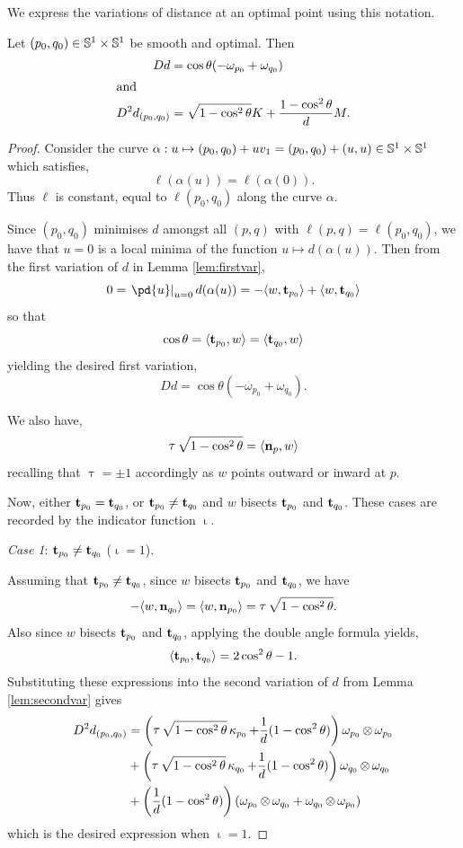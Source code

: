 \documentclass[11pt]{amsart}
\DeclareMathOperator{\tangindicator}{\iota}
\DeclareMathOperator{\norindicator}{\tau}
\begin{document}
We express the variations of distance at an optimal point using this notation.

\begin{prop}
\label{prop:spatial_var}
Let $(p_0, q_0) \in \mathbb{S}^1 \times \mathbb{S}^1$ be smooth and optimal. Then
\[
\begin{split}
D d &= \cos\theta(-\omega_{p_0} + \omega_{q_0}) \\
\intertext{and}
D^2d_{(p_0,q_0)} &= \sqrt{1-\cos^2\theta}K + \frac{1-\cos^2 \theta}{d} M.
\end{split}
\]
\end{prop}

\begin{proof}
Consider the curve $\alpha: u \mapsto (p_0,q_0) + uv_1 = (p_0,q_0) + (u, u) \in \mathbb{S}^1\times \mathbb{S}^1$ which satisfies,
\[
\ell(\alpha(u)) = \ell(\alpha(0)).
\]
Thus $\ell$ is constant, equal to $\ell(p_0, q_0)$ along the curve $\alpha$.

Since $(p_0, q_0)$ minimises $d$ amongst all $(p,q)$ with $\ell(p, q) = \ell(p_0, q_0)$, we have that $u=0$ is a local minima of the function $u\mapsto d(\alpha(u))$. Then from the first variation of $d$ in Lemma \ref{lem:firstvar},
\[
0 = \left.\pd{u}\right|_{u=0} d(\alpha(u)) = -\ip{w}{\tang_{p_0}} + \ip{w}{\tang_{q_0}}
\]
so that
\[
\cos\theta = \langle{\operatorname{\mathbf{t}}_{p_0}},{w}\rangle = \langle{\operatorname{\mathbf{t}}_{q_0}},{w}\rangle
\]
yielding the desired first variation,
\[
Dd = \cos\theta(-\omega_{p_0} + \omega_{q_0}).
\]

We also have,
\[
\norindicator \sqrt{1 - \cos^2 \theta} = \ip{\nor_p}{w}
\]
recalling that \(\norindicator = \pm 1\) accordingly as \(w\) points outward or inward at \(p\).

Now, either $\operatorname{\mathbf{t}}_{p_0} = \operatorname{\mathbf{t}}_{q_0}$, or $\operatorname{\mathbf{t}}_{p_0} \ne \operatorname{\mathbf{t}}_{q_0}$ and $w$ bisects $\operatorname{\mathbf{t}}_{p_0}$ and $\operatorname{\mathbf{t}}_{q_0}$. These cases are recorded by the indicator function $\tangindicator$.

\emph{Case 1}: $\operatorname{\mathbf{t}}_{p_0} \ne \operatorname{\mathbf{t}}_{q_0}$ ($\tangindicator = 1$).

Assuming that $\operatorname{\mathbf{t}}_{p_0} \ne \operatorname{\mathbf{t}}_{q_0}$, since \(w\) bisects \(\operatorname{\mathbf{t}}_{p_0}\) and \(\operatorname{\mathbf{t}}_{q_0}\), we have
\[
-\ip{w}{\nor_{q_0}} = \ip{w}{\nor_{p_0}} = \norindicator \sqrt{1-\cos^2\theta}.
\]
Also since $w$ bisects $\operatorname{\mathbf{t}}_{p_0}$ and $\operatorname{\mathbf{t}}_{q_0}$, applying the double angle formula yields,
\[
\langle{\operatorname{\mathbf{t}}_{p_0}},{\operatorname{\mathbf{t}}_{q_0}}\rangle = 2\cos^2\theta - 1.
\]
Substituting these expressions into the second variation of $d$ from Lemma \ref{lem:secondvar} gives
\begin{align*}
D^2d_{(p_0,q_0)} &=  \left(\norindicator \sqrt{1-\cos^2\theta}\curvecurv_{p_0} + \frac{1}{d}(1 - \cos^2\theta) \right) \omega_{p_0} \tensor \omega_{p_0} \\
&+ \left(\norindicator \sqrt{1-\cos^2\theta} \curvecurv_{q_0} + \frac{1}{d}(1 - \cos^2\theta) \right) \omega_{q_0} \tensor \omega_{q_0} \\
&+ \left(\frac{1}{d}(1 - \cos^2\theta) \right) \left(\omega_{p_0} \tensor \omega_{q_0} + \omega_{q_0} \tensor \omega_{p_0} \right)
\end{align*}
which is the desired expression when $\tangindicator=1$.


\end{proof}
\end{document}

